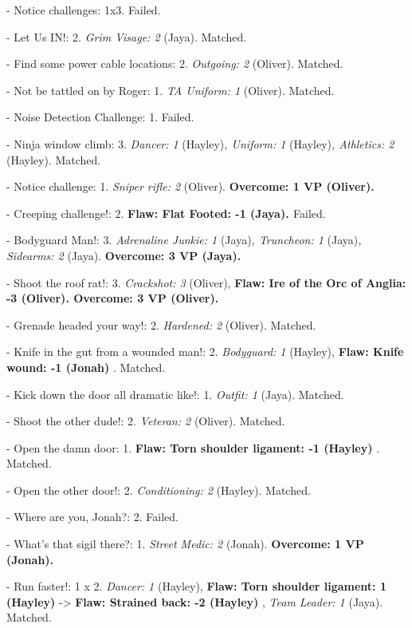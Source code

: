 

{
\parskip=0pt
- Notice challenges: 1x3.  Failed.

- Let Us IN!: 2.  \textit{Grim Visage: 2} (Jaya).  Matched. 

- Find some power cable locations: 2.  \textit{Outgoing: 2} (Oliver). Matched. 

- Not be tattled on by Roger: 1.  \textit{TA Uniform: 1} (Oliver). Matched.

- Noise Detection Challenge: 1. Failed.

- Ninja window climb: 3.  \textit{Dancer: 1 }(Hayley)\textit{, Uniform: 1} (Hayley)\textit{, Athletics: 2 }(Hayley). Matched.

- Notice challenge: 1.  \textit{Sniper rifle: 2} (Oliver). \textbf{ {\color[RGB]{0,0,255}Overcome: 1 VP (Oliver).} }

- Creeping challenge!: 2.  \textbf{ {\color[RGB]{255,0,0}Flaw: Flat Footed: -1 (Jaya). } }Failed.

- Bodyguard Man!: 3.  \textit{Adrenaline Junkie: 1} (Jaya)\textit{, Truncheon: 1} (Jaya)\textit{, Sidearms: 2} (Jaya). \textbf{ {\color[RGB]{0,0,255}Overcome: 3 VP (Jaya).} }

- Shoot the roof rat!: 3.  \textit{Crackshot: 3} (Oliver), \textbf{ {\color[RGB]{255,0,0}Flaw: Ire of the Orc of Anglia: -3 (Oliver). } }\textbf{ {\color[RGB]{0,0,255}Overcome: 3 VP (Oliver).} }

- Grenade headed your way!: 2.  \textit{Hardened: 2} (Oliver). Matched.

- Knife in the gut from a wounded man!: 2.  \textit{Bodyguard: 1} (Hayley), \textbf{ {\color[RGB]{255,0,0}Flaw: Knife wound: -1 (Jonah)} }. Matched. 

- Kick down the door all dramatic like!: 1. \textit{Outfit: 1} (Jaya). Matched.

- Shoot the other dude!: 2.  \textit{Veteran: 2} (Oliver). Matched. 

- Open the damn door: 1.  \textbf{ {\color[RGB]{255,0,0}Flaw: Torn shoulder ligament: -1 (Hayley)} }. Matched. 

- Open the other door!: 2.  \textit{Conditioning: 2} (Hayley). Matched. 

- Where are you, Jonah?: 2.  Failed.

- What's that sigil there?: 1. \textit{Street Medic: 2} (Jonah). \textbf{ {\color[RGB]{0,0,255}Overcome: 1 VP (Jonah).} }

- Run faster!: 1 x 2.  \textit{Dancer: 1} (Hayley), \textbf{ {\color[RGB]{255,0,0}Flaw: Torn shoulder ligament: 1 (Hayley)} } -\textgreater  \textbf{ {\color[RGB]{255,0,0}Flaw: Strained back: -2 (Hayley)} }, \textit{Team Leader: 1} (Jaya). Matched.

}
